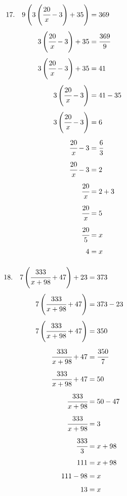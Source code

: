 \documentclass{article}
\begin{document}
\noindent
\begin{minipage}[t]{0.5000\textwidth}
\begin{align*}
17.\hspace{10pt}9\left(3\left(\cfrac{20}{x}-3\right)+35\right)&=369\\[4pt]
3\left(\cfrac{20}{x}-3\right)+35&=\cfrac{369}{9}\\[4pt]
3\left(\cfrac{20}{x}-3\right)+35&=41\\[4pt]
3\left(\cfrac{20}{x}-3\right)&=41-35\\[4pt]
3\left(\cfrac{20}{x}-3\right)&=6\\[4pt]
\cfrac{20}{x}-3&=\cfrac{6}{3}\\[4pt]
\cfrac{20}{x}-3&=2\\[4pt]
\cfrac{20}{x}&=2+3\\[4pt]
\cfrac{20}{x}&=5\\[4pt]
\cfrac{20}{5}&=x\\[4pt]
4&=x\\[4pt]
\end{align*}
\end{minipage}
\begin{minipage}[t]{0.5000\textwidth}
\begin{align*}
18.\hspace{10pt}7\left(\cfrac{333}{x+98}+47\right)+23&=373\\[4pt]
7\left(\cfrac{333}{x+98}+47\right)&=373-23\\[4pt]
7\left(\cfrac{333}{x+98}+47\right)&=350\\[4pt]
\cfrac{333}{x+98}+47&=\cfrac{350}{7}\\[4pt]
\cfrac{333}{x+98}+47&=50\\[4pt]
\cfrac{333}{x+98}&=50-47\\[4pt]
\cfrac{333}{x+98}&=3\\[4pt]
\cfrac{333}{3}&=x+98\\[4pt]
111&=x+98\\[4pt]
111-98&=x\\[4pt]
13&=x\\[4pt]
\end{align*}
\end{minipage}
\vspace{10 mm}
\end{document}

